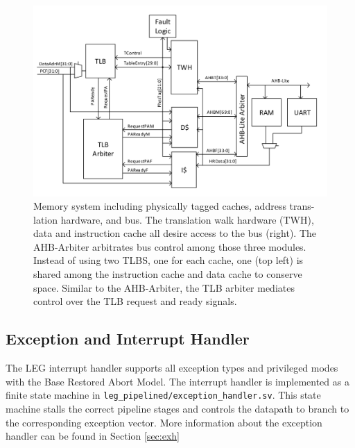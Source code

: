 \begin{figure}[h!]
\centering
\includegraphics[width=\textwidth]{./diagrams/memSys.png}
\caption{Memory system including physically tagged caches, address trans-
lation hardware, and bus. The translation walk hardware (TWH), data and
instruction cache all desire access to the bus (right). The AHB-Arbiter
arbitrates bus control among those three modules. Instead of using two TLBS,
one for each cache, one (top left) is shared among the instruction cache and
data cache to conserve space. Similar to the AHB-Arbiter, the TLB arbiter
mediates control over the TLB request and ready signals.}
\label{fig:mem}
\end{figure}

\subsection{Exception and Interrupt Handler}

The LEG interrupt handler supports all exception types and privileged modes with the Base Restored Abort Model.
The interrupt handler is implemented as a finite state machine in \texttt{leg\_pipelined/exception\_handler.sv}.
This state machine stalls the correct pipeline stages and controls the datapath to branch to the corresponding exception vector.
More information about the exception handler can be found in Section \ref{sec:exh}
